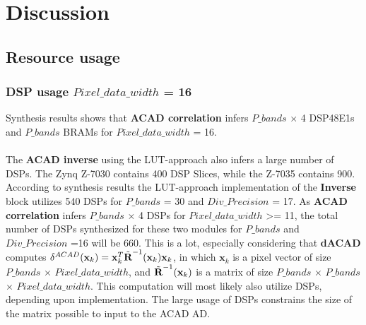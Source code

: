 \chapter{Discussion}
\label{sec:Discussion}

\section{Resource usage}
\subsection{DSP usage $Pixel\_data\_width$ = 16}
Synthesis results shows that \textbf{ACAD correlation} infers $P\_bands$ $\times$ 4 DSP48E1s and $P\_bands$ BRAMs for $Pixel\_data\_width$ = 16. \\


\\
The \textbf{ACAD inverse} using the LUT-approach also infers a large number of DSPs. The Zynq Z-7030 contains 400 DSP Slices, while the Z-7035 contains 900. According to synthesis results the LUT-approach implementation of the \textbf{Inverse} block utilizes 540 DSPs for $P\_bands$ = 30 and $Div\_Precision$ = 17. As \textbf{ACAD correlation} infers $P\_bands$ $\times$ 4 DSPs for $Pixel\_data\_width$ >= 11, the total number of DSPs synthesized for these two modules for $P\_bands$ and $Div\_Precision$ =16 will be 660. This is a lot, especially considering that \textbf{dACAD} computes $\delta^{ACAD}(\textbf{x}_k)= \textbf{x}_k^T\Tilde{\textbf{R}}^{-1}(\textbf{x}_k)\textbf{x}_k$, in which $\textbf{x}_k$ is a pixel vector of size $P\_bands$ $\times$ $Pixel\_data\_width$, and $\Tilde{\textbf{R}}^{-1}(\textbf{x}_k)$ is a matrix of size $P\_bands$ $\times$ $P\_bands$ $\times$ $Pixel\_data\_width$. This computation will most likely also utilize DSPs, depending upon implementation.  
The large usage of DSPs constrains the size of the matrix possible to input to the ACAD AD. %
